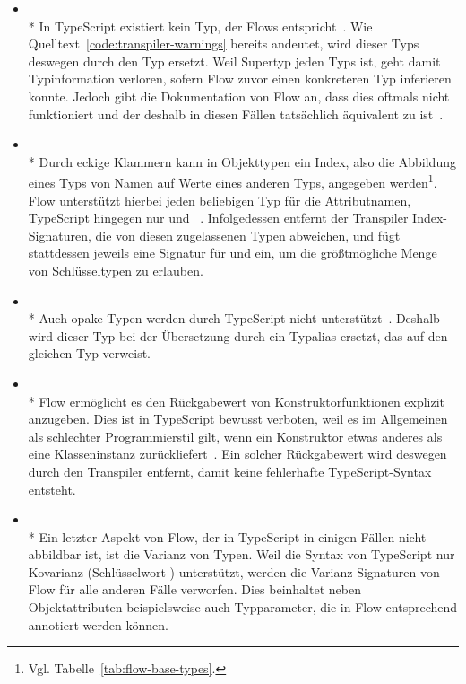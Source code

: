 \begin{itemize}
  \item {}\\*
    In TypeScript existiert kein Typ, der Flows  entspricht~\autocite{TS:GITHUB:NO_EXISTENTIAL_TYPE}. Wie Quelltext~\ref{code:transpiler-warnings} bereits andeutet, wird dieser Typs deswegen durch den Typ  ersetzt. Weil  Supertyp jeden Typs ist, geht damit Typinformation verloren, sofern Flow zuvor einen konkreteren Typ inferieren konnte. Jedoch gibt die Dokumentation von Flow an, dass dies oftmals nicht funktioniert und der  deshalb in diesen Fällen tatsächlich äquivalent zu  ist~\autocite{FLOW:LINT_RULE_REFERENCE}.
  \medbreak
  \item {}\\*
    Durch eckige Klammern kann in Objekttypen ein Index, also die Abbildung eines Typs von Namen auf Werte eines anderen Typs, angegeben werden\footnote{Vgl. Tabelle~\ref{tab:flow-base-types}.}. Flow unterstützt hierbei jeden beliebigen Typ für die Attributnamen, TypeScript hingegen nur  und ~\autocite{TS:HANDBOOK:INTERFACES}. Infolgedessen entfernt der Transpiler Index-Signaturen, die von diesen zugelassenen Typen abweichen, und fügt stattdessen jeweils eine Signatur für  und  ein, um die größtmögliche Menge von Schlüsseltypen zu erlauben.
  \medbreak
  \item {}\\*
    Auch opake Typen werden durch TypeScript nicht unterstützt~\autocite{TS:GITHUB:NO_OPAQUE_TYPE}. Deshalb wird dieser Typ bei der Übersetzung durch ein Typalias ersetzt, das auf den gleichen Typ verweist.
  \medbreak
  \item {}\\*
    Flow ermöglicht es den Rückgabewert von Konstruktorfunktionen explizit anzugeben. Dies ist in TypeScript bewusst verboten, weil es im Allgemeinen als schlechter Programmierstil gilt, wenn ein Konstruktor etwas anderes als eine Klasseninstanz zurückliefert~\autocite{TS:GITHUB:CONSTRUCTOR_RETURN_TYPE}. Ein solcher Rückgabewert wird deswegen durch den Transpiler entfernt, damit keine fehlerhafte TypeScript-Syntax entsteht.
  \medbreak
  \item {}\\*
    Ein letzter Aspekt von Flow, der in TypeScript in einigen Fällen nicht abbildbar ist, ist die Varianz von Typen. Weil die Syntax von TypeScript nur Kovarianz (Schlüsselwort ) unterstützt, werden die Varianz-Signaturen von Flow für alle anderen Fälle verworfen. Dies beinhaltet neben Objektattributen beispielsweise auch Typparameter, die in Flow entsprechend annotiert werden können.
\end{itemize}

